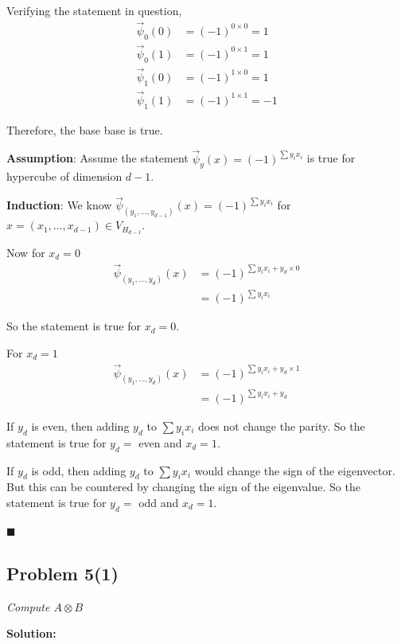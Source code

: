 \documentclass[12pt,a4paper]{article}
\newcommand{\rightqed}{
\begin{flushright}
$\blacksquare$
\end{flushright}
}
\newcommand{\solution}{\noindent\textbf{Solution:}\\\indent}
\begin{document}
Verifying the statement in question,
\begin{align*}
    \vec{\psi}_0(0) &= (-1)^{0\times 0} = 1 \\
    \vec{\psi}_0(1) &= (-1)^{0\times 1} = 1 \\
    \vec{\psi}_1(0) &= (-1)^{1\times 0} = 1 \\
    \vec{\psi}_1(1) &= (-1)^{1\times 1} = -1 
\end{align*}

Therefore, the base base is true.

\textbf{Assumption}: Assume the statement $\vec{\psi}_y(x) = (-1)^{\sum y_ix_i}$ is true for hypercube of dimension $d-1$.

\textbf{Induction}:
We know $\vec{\psi}_{(y_1, \hdots, y_{d-1})}(x) = (-1)^{\sum y_ix_i}$ for $x=(x_1,\hdots, x_{d-1})\in V_{H_{d-1}}$.

Now for $x_d = 0$
\begin{align*}
    \vec{\psi}_{(y_1, \hdots, y_{d})}(x) &= (-1)^{\sum y_ix_i + y_d\times 0} \\
                                         &= (-1)^{\sum y_ix_i}
\end{align*}

So the statement is true for $x_d = 0$.

For $x_d = 1$
\begin{align*}
    \vec{\psi}_{(y_1, \hdots, y_{d})}(x) &= (-1)^{\sum y_ix_i + y_d\times 1} \\
                                         &= (-1)^{\sum y_ix_i + y_d}
\end{align*}

If $y_d$ is even, then adding $y_d$ to $\sum y_ix_i$ does not change the parity. So the statement is true for $y_d =$ even and $x_d = 1$.

If $y_d$ is odd, then adding $y_d$ to $\sum y_ix_i$ would change the sign of the eigenvector. But this can be countered by changing the sign of the eigenvalue. So the statement is true for $y_d = $ odd and $x_d = 1$.

\rightqed

\newpage
\subsection*{Problem 5(1)}
\textit{
    Compute $A\otimes B$
}

\solution
\end{document}
